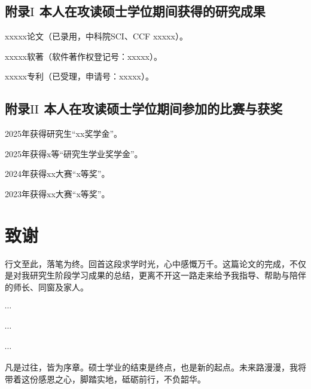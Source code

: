\documentclass[]{WTUthesis}
\begin{document}
\section*{附录$\mathrm{I}$ 本人在攻读硕士学位期间获得的研究成果}
\begin{enumerate}[label={[\arabic*]}, leftmargin=1.5em, labelsep=0.5em, parsep=0pt, itemsep=3pt]
    \songti
    
    \item xxxxx论文（已录用，中科院SCI、CCF xxxxx）。
    
    \item xxxxx软著（软件著作权登记号：xxxxx）。
    
    \item xxxxx专利（已受理，申请号：xxxxx）。

\end{enumerate}

\section*{附录$\mathrm{II}$ 本人在攻读硕士学位期间参加的比赛与获奖}
\begin{enumerate}[label={[\arabic*]}, leftmargin=1.5em, labelsep=0.5em, parsep=0pt, itemsep=3pt]
    \songti
    
    \item 2025年获得研究生“xx奖学金”。
    
    \item 2025年获得x等“研究生学业奖学金”。
    
    \item 2024年获得xx大赛“x等奖”。

    \item 2023年获得xx大赛“x等奖”。

\end{enumerate}


\clearpage
\chapter*{致谢}
行文至此，落笔为终。回首这段求学时光，心中感慨万千。这篇论文的完成，不仅是对我研究生阶段学习成果的总结，更离不开这一路走来给予我指导、帮助与陪伴的师长、同窗及家人。

$\cdots$

$\cdots$

$\cdots$

凡是过往，皆为序章。硕士学业的结束是终点，也是新的起点。未来路漫漫，我将带着这份感恩之心，脚踏实地，砥砺前行，不负韶华。
\end{document}
